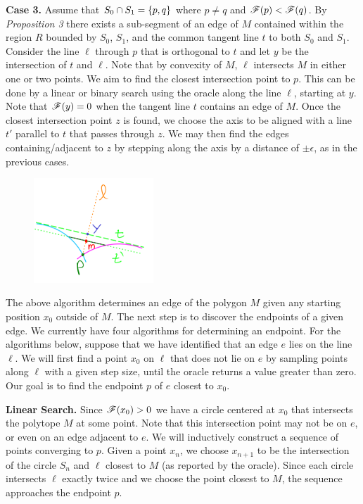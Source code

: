 \documentclass[12pt]{article}
\begin{document}
\begin{flushleft}
\textbf{Case 3.}
Assume that $S_0\cap S_1=\{p,q\}$ where $p\neq q$ and $\mathscr{F}(p)<\mathscr{F}(q)$.
By \textit{Proposition 3} there exists a sub-segment of an edge of $M$ contained within the region $R$ bounded by $S_0$, $S_1$, and the common tangent line $t$ to both $S_0$ and $S_1$.
Consider the line $\ell$ through $p$ that is orthogonal to $t$ and let $y$ be the intersection of $t$ and $\ell$.
Note that by convexity of $M$, $\ell$ intersects $M$ in either one or two points.
We aim to find the closest intersection point to $p$.
This can be done by a linear or binary search using the oracle along the line $\ell$, starting at $y$.
Note that $\mathscr{F}(y)=0$ when the tangent line $t$ contains an edge of $M$.
Once the closest intersection point $z$ is found, we choose the axis to be aligned with a line $t'$ parallel to $t$ that passes through $z$.
We may then find the edges containing/adjacent to $z$ by stepping along the axis by a distance of $\pm\epsilon$, as in the previous cases.

\begin{figure}[H]
	\centering
	\includegraphics[width=0.4\textwidth]{8.png}
\end{figure}

The above algorithm determines an edge of the polygon $M$ given any starting position $x_0$ outside of $M$.
The next step is to discover the endpoints of a given edge.
We currently have four algorithms for determining an endpoint.
For the algorithms below, suppose that we have identified that an edge $e$ lies on the line $\ell$.
We will first find a point $x_0$ on $\ell$ that does not lie on $e$ by sampling points along $\ell$ with a given step size, until the oracle returns a value greater than zero.
Our goal is to find the endpoint $p$ of $e$ closest to $x_0$.

\textbf{Linear Search.}
Since $\mathscr{F}(x_0)>0$ we have a circle centered at $x_0$ that intersects the polytope $M$ at some point.
Note that this intersection point may not be on $e$, or even on an edge adjacent to $e$.
We will inductively construct a sequence of points converging to $p$.
Given a point $x_n$, we choose $x_{n+1}$ to be the intersection of the circle $S_n$ and $\ell$ closest to $M$ (as reported by the oracle).
Since each circle intersects $\ell$ exactly twice and we choose the point closest to $M$, the sequence approaches the endpoint $p$.


\end{flushleft}
\end{document}
